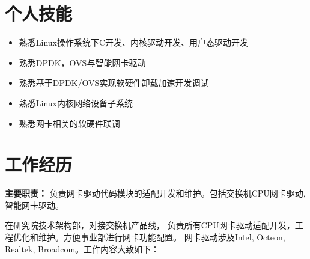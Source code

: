 \documentclass{resume}
\begin{document}
\section{个人技能}
        \begin{itemize}[parsep=0.5ex]
            \item  熟悉Linux操作系统下C开发、内核驱动开发、用户态驱动开发
            \item  熟悉DPDK，OVS与智能网卡驱动
            \item  熟悉基于DPDK/OVS实现软硬件卸载加速开发调试
            \item  熟悉Linux内核网络设备子系统
            \item  熟悉网卡相关的软硬件联调
        \end{itemize}
        \normalsize \par
\sepspace

\section{工作经历}
    \vspace{0.2em}

    \textbf{主要职责：} 
    负责网卡驱动代码模块的适配开发和维护。包括交换机CPU网卡驱动,智能网卡驱动。

    \par


    \hspace{2em}在研究院技术架构部，对接交换机产品线，
    负责所有CPU网卡驱动适配开发，工程优化和维护。方便事业部进行网卡功能配置。
    网卡驱动涉及Intel, Octeon, Realtek, Broadcom。工作内容大致如下：
\end{document}
